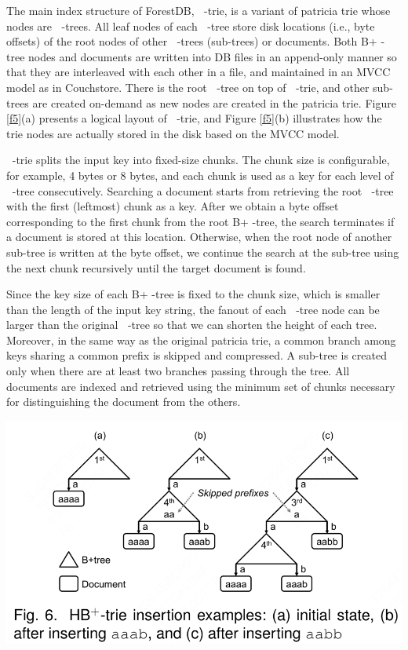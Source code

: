 \documentclass[11pt]{article}
\DeclareMathOperator{\HBP}{\text{HB}^+}
\DeclareMathOperator{\BP}{\text{B}^+}
\begin{document}
The main index structure of ForestDB, \(\HBP\)-trie, is a variant of patricia trie whose nodes are
\(\BP\)-trees. All leaf nodes of each \(\BP\)-tree store disk locations (i.e., byte offsets) of the
root nodes of other \(\BP\)-trees (sub-trees) or documents. Both B+ -tree nodes and documents are
written into DB files in an append-only manner so that they are interleaved with each other in a file,
and maintained in an MVCC model as in Couchstore. There is the root \(\BP\)-tree on top of
\(\HBP\)-trie, and other sub-trees are created on-demand as new nodes are created in the patricia
trie. Figure \ref{f5}(a) presents a logical layout of \(\HBP\)-trie, and Figure \ref{f5}(b) illustrates
how the trie nodes are actually stored in the disk based on the MVCC model.

\(\HBP\)-trie splits the input key into fixed-size chunks. The chunk size is configurable, for
example, 4 bytes or 8 bytes, and each chunk is used as a key for each level of \(\BP\)-tree
consecutively. Searching a document starts from retrieving the root \(\BP\)-tree with the first
(leftmost) chunk as a key. After we obtain a byte offset corresponding to the first chunk from the
root B+ -tree, the search terminates if a document is stored at this location. Otherwise, when the
root node of another sub-tree is written at the byte offset, we continue the search at the sub-tree
using the next chunk recursively until the target document is found.

Since the key size of each B+ -tree is fixed to the chunk size, which is smaller than the length of
the input key string, the fanout of each \(\BP\)-tree node can be larger than the original
\(\BP\)-tree so that we can shorten the height of each tree. Moreover, in the same way as the original
patricia trie, a common branch among keys sharing a common prefix is skipped and compressed. A
sub-tree is created only when there are at least two branches passing through the tree. All documents
are indexed and retrieved using the minimum set of chunks necessary for distinguishing the document
from the others.

\begin{center}
\includegraphics[width=.8\textwidth]{../../images/papers/148.png}
\label{f6}
\end{center}
\end{document}
